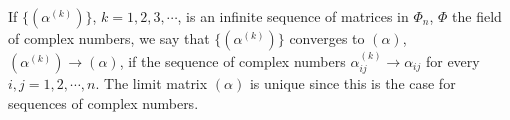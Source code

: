 If $\{(\alpha^{(k)})\}$, $k = 1, 2, 3, \cdots$, is an infinite sequence of matrices in $\Phi_n$, $\Phi$ the field of complex numbers, we say that $\{(\alpha^{(k)})\}$ converges to $(\alpha)$, $(\alpha^{(k)}) \rightarrow (\alpha)$, if the sequence of complex numbers $\alpha_{ij}^{(k)} \rightarrow \alpha_{ij}$ for every $i, j = 1, 2, \cdots, n$. The limit matrix $(\alpha)$ is unique since this is the case for sequences of complex numbers.
